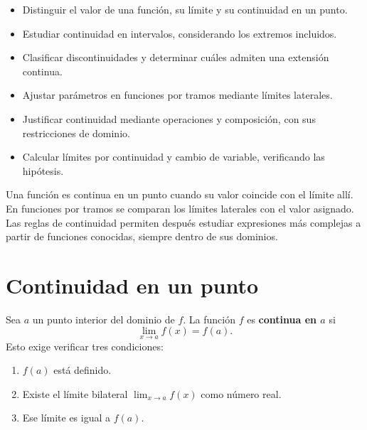 \documentclass[10pt,a5paper]{article}
\begin{document}

\begin{objetivos}
\begin{itemize}
  \item Distinguir el valor de una función, su límite y su continuidad en un punto.
  \item Estudiar continuidad en intervalos, considerando los extremos incluidos.
  \item Clasificar discontinuidades y determinar cuáles admiten una extensión continua.
  \item Ajustar parámetros en funciones por tramos mediante límites laterales.
  \item Justificar continuidad mediante operaciones y composición, con sus restricciones de dominio.
  \item Calcular límites por continuidad y cambio de variable, verificando las hipótesis.
\end{itemize}
\end{objetivos}

\begin{resumen}
Una función es continua en un punto cuando su valor coincide con el límite allí. En funciones por tramos se comparan los límites laterales con el valor asignado. Las reglas de continuidad permiten después estudiar expresiones más complejas a partir de funciones conocidas, siempre dentro de sus dominios.
\end{resumen}


\section*{Continuidad en un punto}

\begin{definicion}
Sea $a$ un punto interior del dominio de $f$. La función $f$ es \textbf{continua en $a$} si
\[
  \lim_{x\to a}f(x)=f(a).
\]
Esto exige verificar tres condiciones:
\begin{enumerate}
  \item $f(a)$ está definido.
  \item Existe el límite bilateral $\lim_{x\to a}f(x)$ como número real.
  \item Ese límite es igual a $f(a)$.
\end{enumerate}
\end{definicion}
\end{document}
